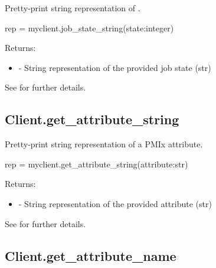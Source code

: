 \summary

Pretty-print string representation of .

\format

\pyspecificstart
\begin{codepar}
rep = myclient.job_state_string(state:integer)
\end{codepar}
\pyspecificend

\begin{arglist}
\end{arglist}

Returns:
\begin{itemize}
    \item {} - String representation of the provided job state (str)
\end{itemize}

See  for further details.


\subsection{Client.get_attribute_string}

\summary

Pretty-print string representation of a \ac{PMIx} attribute.

\format

\pyspecificstart
\begin{codepar}
rep = myclient.get_attribute_string(attribute:str)
\end{codepar}
\pyspecificend

\begin{arglist}
\end{arglist}

Returns:
\begin{itemize}
    \item {} - String representation of the provided attribute (str)
\end{itemize}

See  for further details.


\subsection{Client.get_attribute_name}


